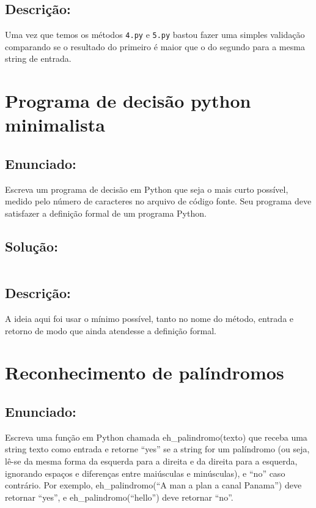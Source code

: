 \documentclass[9pt,a4paper,twocolumn,twoside]{tau-class/tau}
\begin{document}
    \subsection{Descrição:}
	
        Uma vez que temos os métodos \texttt{4.py} e \texttt{5.py} bastou fazer uma simples validação comparando se o resultado do primeiro é maior que o do segundo para a mesma string de entrada.
		
\section{Programa de decisão python minimalista}

    \subsection{Enunciado:}

        \begin{tauenv}[frametitle = {Programa de decisão python minimalista.}]
                Escreva um programa de decisão em Python que seja o mais curto possível, medido pelo número de
                caracteres no arquivo de código fonte. Seu programa deve satisfazer a definição formal de um programa Python.
        \end{tauenv}

    \subsection{Solução:}

        \inputminted{python}{src/7/7.py}

    \subsection{Descrição:}

        A ideia aqui foi usar o mínimo possível, tanto no nome do método, entrada e retorno de modo que ainda atendesse a definição formal.
		
\section{Reconhecimento de palíndromos}

    \subsection{Enunciado:}
	
        \begin{tauenv}[frametitle = Reconhecimento de palíndromos.]
                Escreva uma função em Python chamada eh\_palindromo(texto) que receba uma string texto como entrada e retorne ``yes'' se a string for um palíndromo (ou seja, lê-se da mesma forma da esquerda para a direita e da direita para a esquerda, ignorando espaços e diferenças entre maiúsculas e minúsculas), e ``no'' caso contrário. Por exemplo, eh\_palindromo(``A man a plan a canal Panama'') deve retornar ``yes'', e eh\_palindromo(``hello'') deve retornar ``no''.
        \end{tauenv}
		
\end{document}

